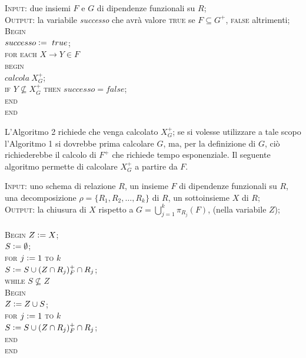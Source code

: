 \begin{alg}
\textsc{Input:} due insiemi $F$ e $G$ di dipendenze funzionali su $R$;\\
\textsc{Output:} la variabile \emph{successo} che avrà valore \textsc{true} se $F\subseteq G^+$, \textsc{false}
altrimenti;\\
\textsc{Begin}\\
$successo\vcentcolon=\ true$;\\
\textsc{for each} $X \rightarrow Y \in F$\\
\indent \textsc{begin}\\
\indent $calcola\ X_{G}^+$;\\
\indent \textsc{if} $Y \not\subseteq X^+_G$ \textsc{then} $successo=false$;\\
\indent \textsc{end}\\
\textsc{end}\\
\end{alg}

L'Algoritmo 2 richiede che venga calcolato $X^{+}_G$; se si volesse utilizzare a tale scopo l'Algoritmo 1
si dovrebbe prima calcolare $G$, ma, per la definizione di $G$, ciò richiederebbe il calcolo di $F^+$ che
richiede tempo esponenziale. Il seguente algoritmo permette di calcolare $X^{+}_G$ a partire da $F$.

\begin{alg}
\textsc{Input}: uno schema di relazione $R$, un insieme $F$ di dipendenze funzionali su $R$, una
decomposizione $\rho =\{R_1, R_2, \ldots, R_k\}$ di $R$, un sottoinsieme $X$ di $R$;\\
\textsc{Output}: la chiusura di $X$ rispetto a $G = \bigcup_{j=1}^k \pi_{R_j}(F)$, (nella variabile $Z$);\\\\
\textsc{Begin}
$Z\vcentcolon = X$;\\
$S\vcentcolon = \emptyset$;\\
\textsc{for} $j\vcentcolon = 1$ \textsc{to} $k$\\
\indent$S \vcentcolon= S \cup (Z \cap R_j)^{+}_F \cap R_j$;\\
\textsc{while} $S \not\subseteq Z$\\
\indent \textsc{Begin}\\
\indent $Z\vcentcolon = Z \cup S$;\\
\indent \textsc{for} $j\vcentcolon= 1$ \textsc{to} $k$\\
\indent \indent $S\vcentcolon= S \cup (Z \cap R_j)^{+}_F \cap R_j$;\\
\indent \textsc{end}\\
\textsc{end}\\
\end{alg}

